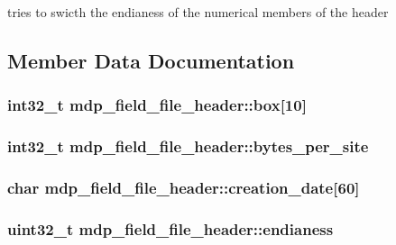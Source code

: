 tries to swicth the endianess of the numerical members of the header 

\subsection{Member Data Documentation}
\hypertarget{classmdp__field__file__header_a4354675f8beac1523480de46d3441357}{
\subsubsection[{box}]{\setlength{\rightskip}{0pt plus 5cm}int32\_\-t {\bf mdp\_\-field\_\-file\_\-header::box}\mbox{[}10\mbox{]}}}
\label{classmdp__field__file__header_a4354675f8beac1523480de46d3441357}
\hypertarget{classmdp__field__file__header_a904de1a1c617f55536ea6961693646f2}{
\subsubsection[{bytes\_\-per\_\-site}]{\setlength{\rightskip}{0pt plus 5cm}int32\_\-t {\bf mdp\_\-field\_\-file\_\-header::bytes\_\-per\_\-site}}}
\label{classmdp__field__file__header_a904de1a1c617f55536ea6961693646f2}
\hypertarget{classmdp__field__file__header_abc00b44219d97450f858530e2f357bd5}{
\subsubsection[{creation\_\-date}]{\setlength{\rightskip}{0pt plus 5cm}char {\bf mdp\_\-field\_\-file\_\-header::creation\_\-date}\mbox{[}60\mbox{]}}}
\label{classmdp__field__file__header_abc00b44219d97450f858530e2f357bd5}
\hypertarget{classmdp__field__file__header_aabc93969ba727e3e368608e21767a8d1}{
\subsubsection[{endianess}]{\setlength{\rightskip}{0pt plus 5cm}uint32\_\-t {\bf mdp\_\-field\_\-file\_\-header::endianess}}}
